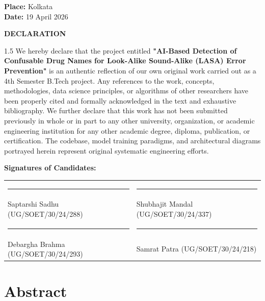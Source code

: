\documentclass[12pt,a4paper]{report}
\begin{document}
\vspace{1.5cm}
\noindent\textbf{Place:} Kolkata \\ \textbf{Date:} 19 April 2026

\clearpage
\thispagestyle{plain}
\begin{center}
  {\Large\textbf{DECLARATION}}
\end{center}
\vspace{16pt}

\begin{spacing}{1.5}
We hereby declare that the project entitled \textbf{"AI-Based Detection of Confusable Drug Names for Look-Alike Sound-Alike (LASA) Error Prevention"} is an authentic reflection of our own original work carried out as a 4th Semester B.Tech project. Any references to the work, concepts, methodologies, data science principles, or algorithms of other researchers have been properly cited and formally acknowledged in the text and exhaustive bibliography. We further declare that this work has not been submitted previously in whole or in part to any other university, organization, or academic engineering institution for any other academic degree, diploma, publication, or certification. The codebase, model training paradigms, and architectural diagrams portrayed herein represent original systematic engineering efforts.
\end{spacing}

\vspace{36pt}
\noindent\textbf{Signatures of Candidates:}

\vspace{16pt}
\noindent
\begin{tabular}{@{}p{} p{}@{}}
  \rule{6.5cm}{0.4pt} & \rule{6.5cm}{0.4pt} \\
  Saptarshi Sadhu (UG/SOET/30/24/288) & Shubhajit Mandal (UG/SOET/30/24/337) \\[2cm]
  \rule{6.5cm}{0.4pt} & \rule{6.5cm}{0.4pt} \\
  Debargha Brahma (UG/SOET/30/24/293) & Samrat Patra (UG/SOET/30/24/218) \\
\end{tabular}

\newpage
\section*{\huge \bfseries Abstract}
\vspace{0.5cm}
\end{document}
